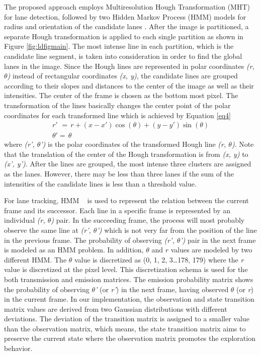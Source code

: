 \documentclass[a4paper,oneside,12pt]{report}
\begin{document}
\par
The proposed approach employs Multiresolution Hough Transformation (MHT) for lane detection, followed by two Hidden Markov Process (HMM) models for radius and orientation of the candidate lanes \cite{kaplan_fast_2010}. After the image is partitioned, a separate Hough transformation is applied to each single partition as shown in Figure \ref{fig:ldfigmain}. The most intense line in each partition, which is the candidate line segment, is taken into consideration in order to find the global lanes in the image. Since the Hough lines are represented in polar coordinates \textit{(r, $\theta $)} instead of rectangular coordinates \textit{(x, y)}, the candidate lines are grouped according to their slopes and distances to the center of the image as well as their intensities. The center of the frame is chosen as the bottom most pixel. The transformation of the lines basically changes the center point of the polar coordinates for each transformed line which is achieved by Equation \ref{eq4}
\begin{equation} 
\label{eq4} 
\begin{array}{l} {r'\, \, =\, r+(x-x')\cos (\theta )+(y-y')\sin (\theta )} \\ {\theta '=\, \theta } \end{array} 
\end{equation}
\noindent where \textit{(r', $\theta $')} is the polar coordinates of the transformed Hough line \textit{(r, $\theta $)}. Note that the translation of the center of the Hough transformation is from \textit{(x, y)} to \textit{(x', y')}. 
After the lines are grouped, the most intense three clusters are assigned as the lanes. However, there may be less than three lanes if the sum of the intensities of the candidate lines is less than a threshold value.

For lane tracking, HMM ~\cite{rabiner_introduction_1986} is used to represent the relation between the current frame and its successor. Each line in a specific frame is represented by an individual \textit{(r, $\theta $)} pair. In the succeeding frame, the process will most probably observe the same line at \textit{(r', $\theta $')} which is not very far from the position of the line in the previous frame. The probability of observing \textit{(r', $\theta $')} pair in the next frame is modeled as an HMM problem. In addition, \textit{$\theta $} and $r$ values are modeled by two different HMM. The \textit{$\theta $} value is discretized as (0, 1, 2, 3\dots 178, 179) where the \textit{r} value is discretized at the pixel level. This discretization schema is used for the both transmission and emission matrices. The emission probability matrix shows the probability of observing \textit{$\theta $'} (or \textit{r'}) in the next frame, having observed \textit{$\theta $} (or \textit{r}) in the current frame. In our implementation, the observation and state transition matrix values are derived from two Gaussian distributions with different deviations. The deviation of the transition matrix is assigned to a smaller value than the observation matrix, which means, the state transition matrix aims to preserve the current state where the observation matrix promotes the exploration behavior.
\end{document}
